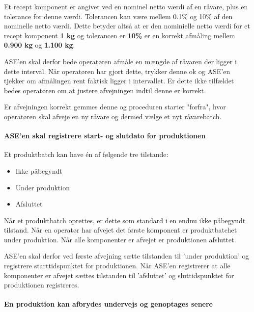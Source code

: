 \documentclass[a4paper]{article}
\begin{document}
Et recept komponent er angivet ved en nominel netto værdi af en råvare, plus en tolerance for denne værdi. Tolerancen kan være mellem 0.1\% og 10\% af den nominelle netto værdi. Dette betyder altså at er den nominielle netto værdi for et recept komponent \textbf{1 kg} og tolerancen er \textbf{10\%} er en korrekt afmåling mellem \textbf{0.900 kg} og \textbf{1.100 kg}.

ASE'en skal derfor bede operatøren afmåle en mængde af råvaren der ligger i dette interval. Når operatøren har gjort dette, trykker denne ok og ASE'en tjekker om afmålingen rent faktisk ligger i intervallet. Er dette ikke tilfældet bedes operatøren om at justere afvejningen indtil denne er korrekt.

Er afvejningen korrekt gemmes denne og proceduren starter "forfra", hvor operatøren skal afveje en ny råvare og dermed vælge et nyt råvarebatch.


\paragraph{ASE'en skal registrere start- og slutdato for produktionen} %

Et produktbatch kan have én af følgende tre tilstande:
\begin{itemize}
  \item Ikke påbegyndt
  \item Under produktion
  \item Afsluttet
\end{itemize}

Når et produktbatch oprettes, er dette som standard i en endnu ikke påbegyndt tilstand. Når en operatør har afvejet det første komponent er produktbatchet under produktion. Når alle komponenter er afvejet er produktionen afsluttet.

ASE'en skal derfor ved første afvejning sætte tilstanden til 'under produktion' og registrere starttidspunktet for produktionen. Når ASE'en registrerer at alle komponenter er afvejet sættes tilstanden til 'afsluttet' og sluttidspunktet for produktionen registreres.


\paragraph{En produktion kan afbrydes undervejs og genoptages senere} %
\end{document}
